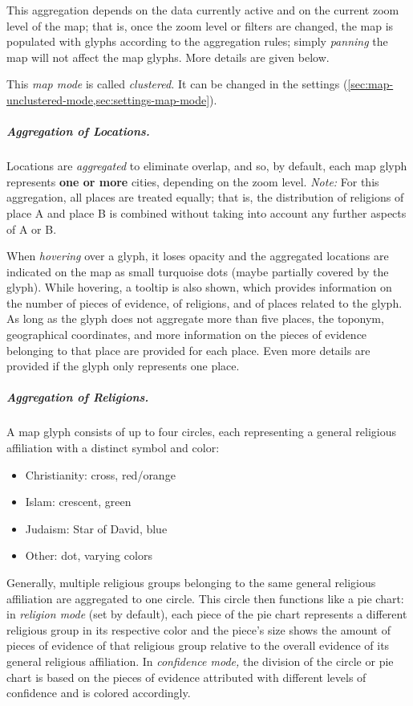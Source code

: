 This aggregation depends on the data currently active and on the current zoom level of the map;
that is, once the zoom level or filters are changed, the map is populated with glyphs according to the aggregation rules;
simply \emph{panning} the map will not affect the map glyphs.
More details are given below.

This \emph{map mode} is called \emph{clustered.}
It can be changed in the settings (\cref{sec:map-unclustered-mode,sec:settings-map-mode}).


\subparagraph{Aggregation of Locations.}
Locations are \emph{aggregated} to eliminate overlap, and so, by default, each map glyph represents \textbf{one or more} cities, depending on the zoom level.
\emph{Note:} For this aggregation, all places are treated equally;
that is, the distribution of religions of place A and place B is combined without taking into account any further aspects of A or B.

\label{sec:map-glyph-hovering-tooltip}
When \emph{hovering} over a glyph, it loses opacity and the aggregated locations are indicated on the map as small turquoise dots (maybe partially covered by the glyph).
While hovering, a tooltip is also shown, which provides information on the number of pieces of evidence, of religions, and of places related to the glyph.
As long as the glyph does not aggregate more than five places, the toponym, geographical coordinates, and more information on the pieces of evidence belonging to that place are provided for each place.
Even more details are provided if the glyph only represents one place.

\subparagraph{Aggregation of Religions.}
A map glyph consists of up to four circles, each representing a general religious affiliation with a distinct symbol and color:

\begin{itemize}
  \item Christianity: cross, red/orange
  \item Islam: crescent, green
  \item Judaism: Star of David, blue
  \item Other: dot, varying colors
\end{itemize}

Generally, multiple religious groups belonging to the same general religious affiliation are aggregated to one circle.
This circle then functions like a pie chart:
in \emph{religion mode} (set by default), each piece of the pie chart represents a different religious group in its respective color and the piece's size shows the amount of pieces of evidence of that religious group relative to the overall evidence of its general religious affiliation.
In \emph{confidence mode,} the division of the circle or pie chart is based on the pieces of evidence attributed with different levels of confidence and is colored accordingly.

